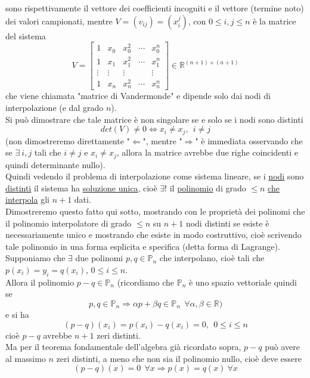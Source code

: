 \documentclass[12pt]{article}
\begin{document}
sono rispettivamente il vettore dei coefficienti incogniti e il vettore (termine noto) dei valori campionati, mentre $V = (v_{ij}) = (x_i^j)$, con $0 \leq i,j \leq n$ è la matrice del sistema
\[
V =
    \begin{bmatrix}
    1 & x_0 & x_0^2 & \cdots & x_0^n \\
    1 & x_1 & x_1^2 & \cdots & x_1^n \\
    \vdots & \vdots & \vdots & \ & \vdots \\
    1 & x_n & x_n^2 & \cdots & x_n^n
    \end{bmatrix}
    \in \mathbb{R}^{(n+1) \times (n+1)}
\]
che viene chiamata "matrice di Vandermonde" e dipende solo dai nodi di interpolazione (e dal grado $n$).\\
Si può dimostrare che tale matrice è non singolare se e solo se i nodi sono distinti
\[
det(V) \neq 0 \iff x_i \neq x_j, \ \ i \neq j
\]
(non dimostreremo direttamente "$\Leftarrow$", mentre "$\Rightarrow$" è immediata osservando che se $\exists \ i,j$ tali che $i\neq j$ e $x_i\neq x_j$, allora la matrice avrebbe due righe coincidenti e quindi determinante nullo).\\ 
Quindi vedendo il problema di interpolazione come sistema lineare, se i \underline{nodi} sono \underline{distinti} il sistema ha \underline{soluzione unica}, cioè \underline{$\exists !$} il \underline{polinomio} di grado $\leq n$ \underline{che interpola} gli $n+1$ dati.\\
Dimostreremo questo fatto qui sotto, mostrando con le proprietà dei polinomi che il polinomio interpolatore di grado $\leq n$ su $n+1$ nodi distinti se esiste è necessariamente unico e mostrando che esiste in modo costruttivo, cioè scrivendo tale polinomio in una forma esplicita e specifica (detta forma di Lagrange).
\newline \newline
{}\\
Supponiamo che $\exists$ due polinomi $p,q \in \mathbb{P}_n$ che interpolano, cioè tali che $p(x_i)=y_i=q(x_i)$, $0\leq i \leq n$.\\ Allora il polinomio $p-q \in \mathbb{P}_n$ (ricordiamo che $\mathbb{P}_n$ è uno spazio vettoriale quindi se
\[
p, q \in \mathbb{P}_n \Rightarrow \alpha p + \beta q \in \mathbb{P}_n \ \
\forall \alpha, \beta \in \mathbb{R})
\]
e si ha
\[
(p-q)(x_i) = p(x_i) - q(x_i) = 0, \ \ 0 \leq i \leq n
\]
cioè $p-q$ avrebbe $n+1$ zeri distinti.\\
Ma per il teorema fondamentale dell'algebra già ricordato sopra, $p-q$ può avere al massimo $n$ zeri distinti, a meno che non sia il polinomio nullo, cioè deve essere
\[
(p-q)(x) = 0 \ \ \forall x \Rightarrow p(x) = q(x) \ \forall x
\]
\end{document}
